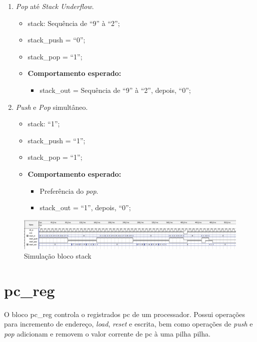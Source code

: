 \documentclass{article}
\begin{document}
\begin{enumerate}
    \item \textit{Pop} até \textit{Stack Underflow}.
    \begin{itemize}
        \item stack: Sequência de ``9'' à ``2'';
        \item stack\_push = ``0'';
        \item stack\_pop = ``1'';
        \item \textbf{Comportamento esperado:}
        \begin{itemize}
            \item stack\_out = Sequência de ``9'' à ``2'', depois, ``0'';
        \end{itemize}
    \end{itemize}

    \item \textit{Push} e \textit{Pop} simultâneo.
    \begin{itemize}
        \item stack: ``1'';
        \item stack\_push = ``1'';
        \item stack\_pop = ``1'';
        \item \textbf{Comportamento esperado:}
        \begin{itemize}
            \item Preferência do \textit{pop}.
            \item stack\_out = ``1'', depois, ``0'';
        \end{itemize}
    \end{itemize}
\end{enumerate}

\begin{figure}[ht]
    \begin{center}
        \includegraphics[width=15cm]{images/stack.png}
        \caption{Simulação bloco stack}
\end{center}
\end{figure}

\newpage

\section{pc\_reg}

O bloco pc\_reg controla o registrados pc de um processador. Possui operações para incremento de endereço, \textit{load}, \textit{reset} e escrita, bem como operações de \textit{push} e \textit{pop} adicionam e removem o valor corrente de pc à uma pilha pilha.\\
\end{document}
